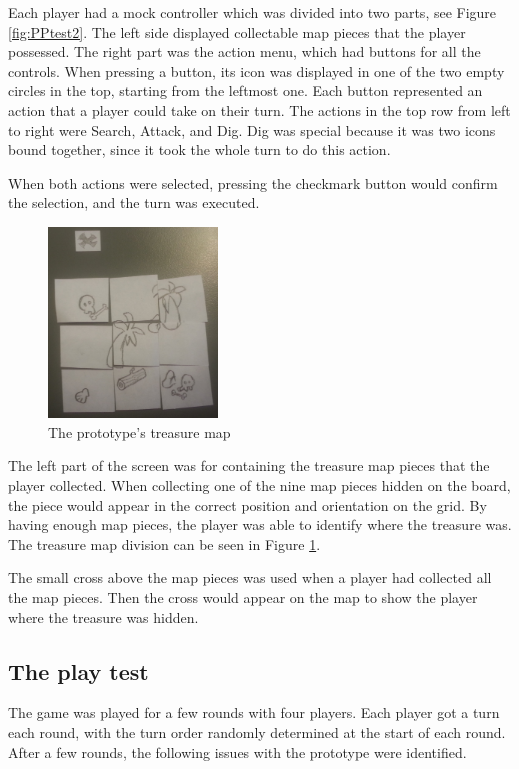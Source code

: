 Each player had a mock controller which was divided into two parts, see Figure \ref{fig:PPtest2}. The left side displayed collectable map pieces that the player possessed. The right part was the action menu, which had buttons for all the controls. When pressing a button, its icon was displayed in one of the two empty circles in the top, starting from the leftmost one. Each button represented an action that a player could take on their turn. The actions in the top row from left to right were Search, Attack, and Dig. Dig was special because it was two icons bound together, since it took the whole turn to do this action.

When both actions were selected, pressing the checkmark button would confirm the selection, and the turn was executed.

\begin{figure}[h!]
\centering
\includegraphics[width=0.4\textwidth]{figures/PPtestMap} 
\caption{The prototype's treasure map}\label{fig:PPtest3}
\end{figure}

The left part of the screen was for containing the treasure map pieces that the player collected. When collecting one of the nine map pieces hidden on the board, the piece would appear in the correct position and orientation on the grid. By having enough map pieces, the player was able to identify where the treasure was. The treasure map division can be seen in Figure \ref{fig:PPtest3}.

The small cross above the map pieces was used when a player had collected all the map pieces. Then the cross would appear on the map to show the player where the treasure was hidden.

\subsection{The play test}
The game was played for a few rounds with four players. Each player got a turn each round, with the turn order randomly determined at the start of each round.  After a few rounds, the following issues with the prototype were identified.

